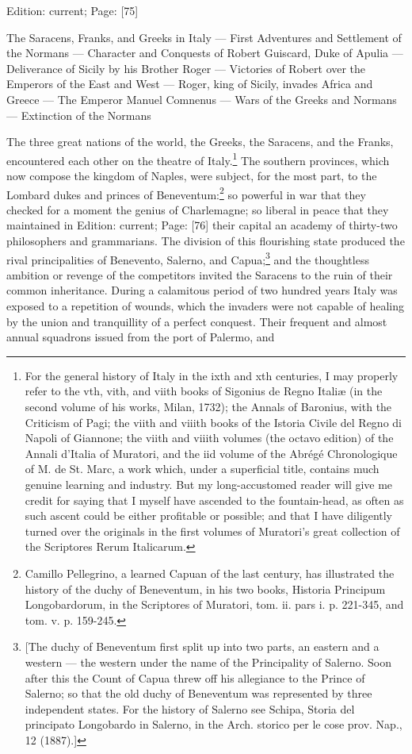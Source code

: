 Edition: current; Page: [75]


The Saracens, Franks, and Greeks in Italy \texthebrew{—} First Adventures and Settlement of the Normans \texthebrew{—} Character and Conquests of Robert Guiscard, Duke of Apulia \texthebrew{—} Deliverance of Sicily by his Brother Roger \texthebrew{—} Victories of Robert over the Emperors of the East and West \texthebrew{—} Roger, king of Sicily, invades Africa and Greece \texthebrew{—} The Emperor Manuel Comnenus \texthebrew{—} Wars of the Greeks and Normans \texthebrew{—} Extinction of the Normans

The three great nations of the world, the Greeks, the Saracens, and the Franks, encountered each other on the theatre of Italy.\footnote{For the general history of Italy in the ixth and xth centuries, I may properly refer to the vth, vith, and viith books of Sigonius de Regno Italiæ (in the second volume of his works, Milan, 1732); the Annals of Baronius, with the Criticism of Pagi; the viith and viiith books of the Istoria Civile del Regno di Napoli of Giannone; the viith and viiith volumes (the octavo edition) of the Annali d\texthebrew{}’Italia of Muratori, and the iid volume of the Abrégé Chronologique of M. de St. Marc, a work which, under a superficial title, contains much genuine learning and industry. But my long-accustomed reader will give me credit for saying that I myself have ascended to the fountain-head, as often as such ascent could be either profitable or possible; and that I have diligently turned over the originals in the first volumes of Muratori\texthebrew{}’s great collection of the Scriptores Rerum Italicarum.} The southern provinces, which now compose the kingdom of Naples, were subject, for the most part, to the Lombard dukes and princes of Beneventum:\footnote{Camillo Pellegrino, a learned Capuan of the last century, has illustrated the history of the duchy of Beneventum, in his two books, Historia Principum Longobardorum, in the Scriptores of Muratori, tom. ii. pars i. p. 221-345, and tom. v. p. 159-245.} so powerful in war that they checked for a moment the genius of Charlemagne; so liberal in peace that they maintained in Edition: current; Page: [76] their capital an academy of thirty-two philosophers and grammarians. The division of this flourishing state produced the rival principalities of Benevento, Salerno, and Capua;\footnote{[The duchy of Beneventum first split up into two parts, an eastern and a western \texthebrew{—} the western under the name of the Principality of Salerno. Soon after this the Count of Capua threw off his allegiance to the Prince of Salerno; so that the old duchy of Beneventum was represented by three independent states. For the history of Salerno see Schipa, Storia del principato Longobardo in Salerno, in the Arch. storico per le cose prov. Nap., 12 (1887).]} and the thoughtless ambition or revenge of the competitors invited the Saracens to the ruin of their common inheritance. During a calamitous period of two hundred years Italy was exposed to a repetition of wounds, which the invaders were not capable of healing by the union and tranquillity of a perfect conquest. Their frequent and almost annual squadrons issued from the port of Palermo, and 
